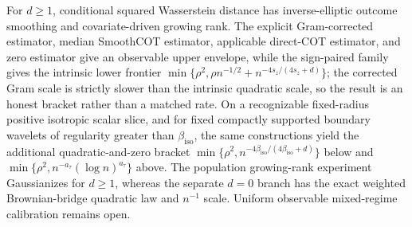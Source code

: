 For \(d\ge1\), conditional squared Wasserstein distance has inverse-elliptic outcome smoothing and covariate-driven growing rank. The explicit Gram-corrected estimator, median SmoothCOT estimator, applicable direct-COT estimator, and zero estimator give an observable upper envelope, while the sign-paired family gives the intrinsic lower frontier \(\min\{\rho^2,\rho n^{-1/2}+n^{-4s_z/(4s_z+d)}\}\); the corrected Gram scale is strictly slower than the intrinsic quadratic scale, so the result is an honest bracket rather than a matched rate. On a recognizable fixed-radius positive isotropic scalar slice, and for fixed compactly supported boundary wavelets of regularity greater than \(\beta_{\mathrm{iso}}\), the same constructions yield the additional quadratic-and-zero bracket \(\min\{\rho^2,n^{-4\beta_{\mathrm{iso}}/(4\beta_{\mathrm{iso}}+d)}\}\) below and \(\min\{\rho^2,n^{-a_\tau}(\log n)^{a_\tau}\}\) above. The population growing-rank experiment Gaussianizes for \(d\ge1\), whereas the separate \(d=0\) branch has the exact weighted Brownian-bridge quadratic law and \(n^{-1}\) scale. Uniform observable mixed-regime calibration remains open.